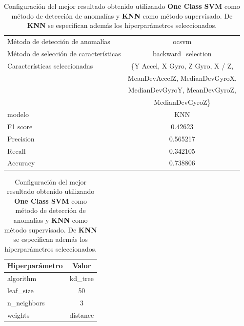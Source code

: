 \begin{appendices}
		\begin{table}[htb]
			\centering
			\caption{Configuración del mejor resultado obtenido utilizando \textbf{One Class SVM} como método de detección de anomalías y \textbf{KNN}
			como método supervisado. De \textbf{KNN} se especifican además los hiperparámetros seleccionados.}
			\label{table:20}
			\begin{tabular}{lc}
				\toprule
					  Método de detección de anomalías &                                              ocsvm \\
				Método de selección de características &                                 backward\_selection \\
						 Características seleccionadas & 					\{Y Accel, X Gyro, Z Gyro, X / Z, \\
													   &						MeanDevAccelZ, MedianDevGyroX, \\
													   &						MedianDevGyroY, MeanDevGyroZ, \\
													   &						MedianDevGyroZ\} \\
												modelo &                                                KNN \\
											  F1 score &                                            0.42623 \\
											 Precision &                                           0.565217 \\
												Recall &                                           0.342105 \\
											  Accuracy &                                           0.738806 \\
				\bottomrule
			\end{tabular}
			\newline
			\newline

			\begin{tabular}{lc}
				\toprule
				Hiperparámetro &    Valor \\
				\midrule
					 algorithm &  kd\_tree \\
					 leaf\_size &       50 \\
				   n\_neighbors &        3 \\
					   weights & distance \\
				\bottomrule
			\end{tabular}
			
		\end{table}
	

\end{appendices}
